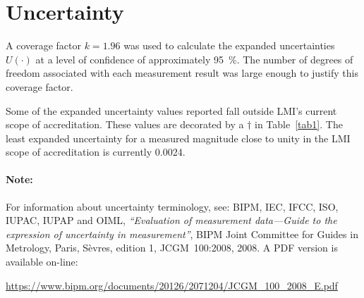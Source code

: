 \documentclass[11pt,a4paper]{article}
\newcommand{\referenceGUM}{
For information about uncertainty terminology, see: 
BIPM, IEC, IFCC, ISO, IUPAC, IUPAP and OIML, 
\textit{``Evaluation of measurement data---Guide to the expression of uncertainty in measurement''}, 
BIPM Joint Committee for Guides in Metrology, Paris, S\`evres, edition 1, JCGM~100:2008, 2008. 
A PDF version is available on-line:

\begin{center}
	\href{%
		https://www.bipm.org/documents/20126/2071204/JCGM_100_2008_E.pdf
	}{%
		https://www.bipm.org/documents/20126/2071204/JCGM\_100\_2008\_E.pdf
	}
\end{center}
}
\begin{document}
\section{Uncertainty}
A coverage factor $k=1.96$ was used to calculate the expanded uncertainties $U(\cdot)$ at a level of confidence of approximately \SI{95}{\percent}. 
The number of degrees of freedom associated with each measurement result was large enough to justify this coverage factor.  

Some of the expanded uncertainty values reported fall outside LMI's current scope of accreditation. 
These values are decorated by a $\dagger$ in Table~\ref{tab1}. 
The least expanded uncertainty for a measured magnitude close to unity in the LMI scope of accreditation is currently 0.0024. 

\paragraph{Note:} \referenceGUM	%

\end{document}
